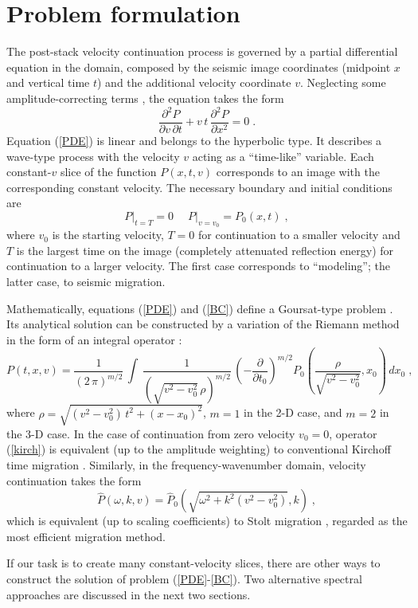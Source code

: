 \section{Problem formulation}
\par
The post-stack velocity continuation process is governed by a partial
differential equation in the domain, composed by the seismic image
coordinates (midpoint $x$ and vertical time $t$) and the additional
velocity coordinate $v$. Neglecting some amplitude-correcting terms
\cite[]{Fomel.sep.92.159}, the equation takes the form
\cite[]{Claerbout.sep.48.79}
\begin{equation}
  \frac{\partial^2 P}{\partial v\, \partial t} +
  v\,t\,\frac{\partial^2 P}{\partial x^2} = 0\;.
  \label{PDE}
\end{equation}
Equation (\ref{PDE}) is linear and belongs to the hyperbolic type. It
describes a wave-type process with the velocity $v$ acting as a
``time-like'' variable. Each constant-$v$ slice of the function
$P(x,t,v)$ corresponds to an image with the corresponding constant
velocity. The necessary boundary and initial conditions are 
\begin{equation}
  \label{BC}
  \left.P\right|_{t=T} = 0\;\quad \left.P\right|_{v=v_0} = P_0 (x,t)\;,
\end{equation}
where $v_0$ is the starting velocity, $T=0$ for continuation to a
smaller velocity and $T$ is the largest time on the image (completely
attenuated reflection energy) for continuation to a larger velocity.
The first case corresponds to ``modeling''; the latter case, to
seismic migration.
\par
Mathematically, equations (\ref{PDE}) and (\ref{BC}) define a
Goursat-type problem \cite[]{kurant}. Its analytical solution can be
constructed by a variation of the Riemann method in the form of an
integral operator \cite[]{me,Fomel.sep.92.159}:
\begin{equation}
P(t,x,v) = \frac{1}{(2\,\pi)^{m/2}}\,
{\int\, 
\frac{1}{(\sqrt{v^2-v_0^2}\,\rho)^{m/2}}\, 
\left(- \frac{\partial}{\partial t_0}\right)^{m/2}
P_0\left(\frac{\rho}{\sqrt{v^2-v_0^2}},x_0\right)\,dx_0}\;,
\label{kirch}
\end{equation}
where $\rho = \sqrt{(v^2-v_0^2)\,t^2 + (x - x_0)^2}$, $m=1$ in the 2-D
case, and $m=2$ in the 3-D case. In the case of continuation from zero
velocity $v_0=0$, operator (\ref{kirch}) is equivalent (up to the
amplitude weighting) to conventional Kirchoff time migration
\cite[]{GEO43-01-00490076}.  Similarly, in the frequency-wavenumber
domain, velocity continuation takes the form
\begin{equation}
  \label{stolt}
  \hat{P} (\omega,k,v) = \hat{P}_0 (\sqrt{\omega^2+k^2 (v^2-v_0^2)},k)\;,
\end{equation}
which is equivalent (up to scaling coefficients) to Stolt migration
\cite[]{GEO50-11-22192244}, regarded as the most efficient migration
method.
\par
If our task is to create many constant-velocity slices, there are
other ways to construct the solution of problem (\ref{PDE}-\ref{BC}).
Two alternative spectral approaches are discussed in the next two
sections.
\par
